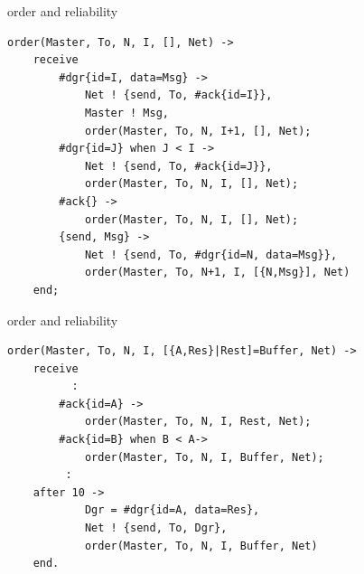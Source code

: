 \begin{frame}[fragile]{order and reliability}

  \begin{lstlisting}
order(Master, To, N, I, [], Net) ->
    receive
        #dgr{id=I, data=Msg} ->
            Net ! {send, To, #ack{id=I}},           
            Master ! Msg,
            order(Master, To, N, I+1, [], Net);
        #dgr{id=J} when J < I ->
            Net ! {send, To, #ack{id=J}},           
            order(Master, To, N, I, [], Net);
        #ack{} ->
            order(Master, To, N, I, [], Net);
        {send, Msg} ->
            Net ! {send, To, #dgr{id=N, data=Msg}},
            order(Master, To, N+1, I, [{N,Msg}], Net)
    end;
  \end{lstlisting}

\end{frame}


\begin{frame}[fragile]{order and reliability}

  \begin{lstlisting}
order(Master, To, N, I, [{A,Res}|Rest]=Buffer, Net) ->
    receive
          :              
        #ack{id=A} ->
            order(Master, To, N, I, Rest, Net);
        #ack{id=B} when B < A->
            order(Master, To, N, I, Buffer, Net);
         :
    after 10 ->
            Dgr = #dgr{id=A, data=Res},
            Net ! {send, To, Dgr},
            order(Master, To, N, I, Buffer, Net)
    end.
  \end{lstlisting}
\end{frame}


